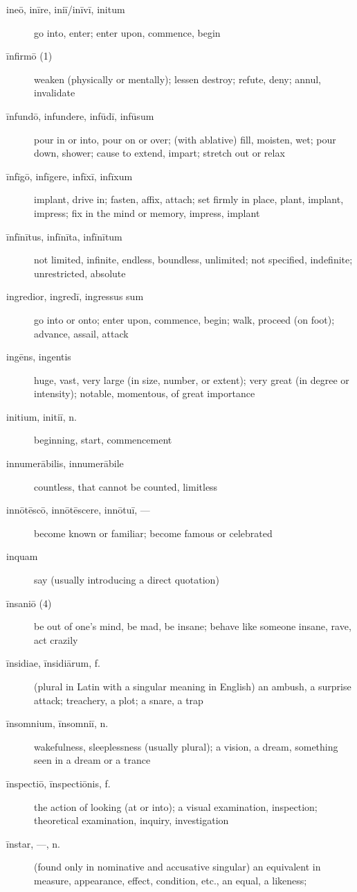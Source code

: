 \begin{description}
    \item[ineō, inīre, iniī/inīvī, initum] go into, enter; enter upon, commence, begin
    \item[īnfirmō (1)] weaken (physically or mentally); lessen destroy; refute, deny; annul, invalidate
    \item[īnfundō, infundere, infūdī, infūsum] pour in or into, pour on or over; (with ablative) fill, moisten, wet; pour down, shower; cause to extend, impart; stretch out or relax
    \item[īnfīgō, infīgere, infīxī, infīxum] implant, drive in; fasten, affix, attach; set firmly in place, plant, implant, impress; fix in the mind or memory, impress, implant
    \item[īnfīnītus, infīnīta, infīnītum] not limited, infinite, endless, boundless, unlimited; not specified, indefinite; unrestricted, absolute
    \item[ingredior, ingredī, ingressus sum] go into or onto; enter upon, commence, begin; walk, proceed (on foot); advance, assail, attack
    \item[ingēns, ingentis] huge, vast, very large (in size, number, or extent); very great (in degree or intensity); notable, momentous, of great importance
    \item[initium, initiī, n.] beginning, start, commencement
    \item[innumerābilis, innumerābile] countless, that cannot be counted, limitless
    \item[innōtēscō, innōtēscere, innōtuī, ---] become known or familiar; become famous or celebrated
    \item[inquam] say (usually introducing a direct quotation)
    \item[īnsaniō (4)] be out of one's mind, be mad, be insane; behave like someone insane, rave, act crazily
    \item[īnsidiae, īnsidiārum, f.] (plural in Latin with a singular meaning in English) an ambush, a surprise attack; treachery, a plot; a snare, a trap
    \item[īnsomnium, īnsomniī, n.] wakefulness, sleeplessness (usually plural); a vision, a dream, something seen in a dream or a trance
    \item[īnspectiō, īnspectiōnis, f.] the action of looking (at or into); a visual examination, inspection; theoretical examination, inquiry, investigation
    \item[īnstar, ---, n.] (found only in nominative and accusative singular) an equivalent in measure, appearance, effect, condition, etc., an equal, a likeness;

\end{description}
